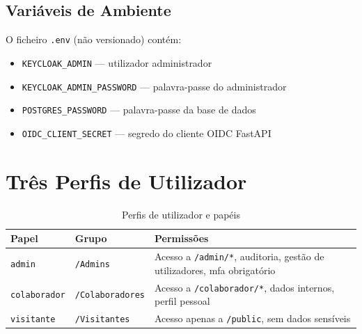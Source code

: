 \subsection{Variáveis de Ambiente}

O ficheiro \texttt{.env} (não versionado) contém:
\begin{itemize}
  \item \texttt{KEYCLOAK\_ADMIN} — utilizador administrador
  \item \texttt{KEYCLOAK\_ADMIN\_PASSWORD} — palavra-passe do administrador
  \item \texttt{POSTGRES\_PASSWORD} — palavra-passe da base de dados
  \item \texttt{OIDC\_CLIENT\_SECRET} — segredo do cliente OIDC FastAPI
\end{itemize}

\section{Três Perfis de Utilizador}

\begin{table}[h!]
\centering
\caption{Perfis de utilizador e papéis}
\label{tab:perfis}
\begin{tabularx}{\textwidth}{|l|l|X|}
\hline
\textbf{Papel} & \textbf{Grupo} & \textbf{Permissões} \\ \hline
\texttt{admin} & \texttt{/Admins} & Acesso a \texttt{/admin/*}, auditoria, gestão de utilizadores, \gls{mfa} obrigatório \\ \hline
\texttt{colaborador} & \texttt{/Colaboradores} & Acesso a \texttt{/colaborador/*}, dados internos, perfil pessoal \\ \hline
\texttt{visitante} & \texttt{/Visitantes} & Acesso apenas a \texttt{/public}, sem dados sensíveis \\ \hline
\end{tabularx}
\end{table}
